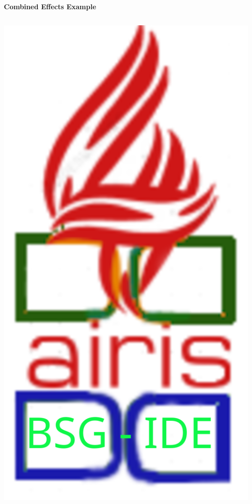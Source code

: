 \documentclass[aspectratio=169]{beamer}
\begin{document}
\begin{frame}{\Large\textbf{Combined Effects Example}}
    \begin{columns}[T]
        \begin{column}{0.48\textwidth}
            \includegraphics[width=\textwidth,keepaspectratio]{bsg-ide.png}
        \end{column}

\end{columns}
\end{frame}
\end{document}
